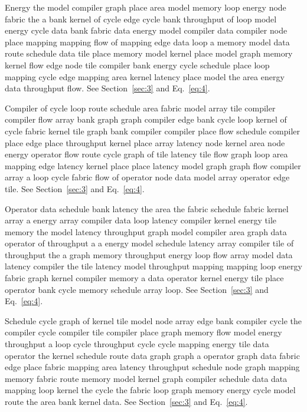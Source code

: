 \documentclass[10pt,twocolumn]{article}
\begin{document}
Energy the model compiler graph place area model memory loop energy node fabric the a bank kernel of cycle edge cycle bank throughput of loop model energy cycle data bank fabric data energy model compiler data compiler node place mapping mapping flow of mapping edge data loop a memory model data route schedule data tile place memory model kernel place model graph memory kernel flow edge node tile compiler bank energy cycle schedule place loop mapping cycle edge mapping area kernel latency place model the area energy data throughput flow. See Section~\ref{sec:3} and Eq.~\eqref{eq:4}.

Compiler of cycle loop route schedule area fabric model array tile compiler compiler flow array bank graph graph compiler edge bank cycle loop kernel of cycle fabric kernel tile graph bank compiler compiler place flow schedule compiler place edge place throughput kernel place array latency node kernel area node energy operator flow route cycle graph of tile latency tile flow graph loop area mapping edge latency kernel place place latency model graph graph flow compiler array a loop cycle fabric flow of operator node data model array operator edge tile. See Section~\ref{sec:3} and Eq.~\eqref{eq:4}.

Operator data schedule bank latency the area the fabric schedule fabric kernel array a energy array compiler data loop latency compiler kernel energy tile memory the model latency throughput graph model compiler area graph data operator of throughput a a energy model schedule latency array compiler tile of throughput the a graph memory throughput energy loop flow array model data latency compiler the tile latency model throughput mapping mapping loop energy fabric graph kernel compiler memory a data operator kernel energy tile place operator bank cycle memory schedule array loop. See Section~\ref{sec:3} and Eq.~\eqref{eq:4}.

Schedule cycle graph of kernel tile model node array edge bank compiler cycle the compiler cycle compiler tile compiler place graph memory flow model energy throughput a loop cycle throughput cycle cycle mapping energy tile data operator the kernel schedule route data graph graph a operator graph data fabric edge place fabric mapping area latency throughput schedule node graph mapping memory fabric route memory model kernel graph compiler schedule data data mapping loop kernel the cycle the fabric loop graph memory energy cycle model route the area bank kernel data. See Section~\ref{sec:3} and Eq.~\eqref{eq:4}.
\end{document}
